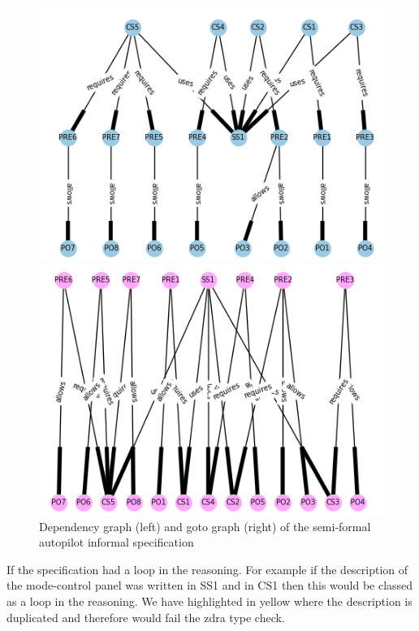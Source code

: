 \begin{figure}[H]
     \centering
     \begin{minipage}{0.45\textwidth}
     \centering
     \includegraphics[scale=0.4]{Figures/fullexample/informaldepgraph.png}
     \end{minipage}\hfill
     \begin{minipage}{0.45\textwidth}
     \centering
     \includegraphics[scale=0.4]{Figures/fullexample/informalgoto.png}
     \end{minipage}
     \caption{Dependency graph (left) and goto graph (right) of the semi-formal autopilot informal specification\label{fig:ifdepgoto}}
     \end{figure}

If the specification had a loop in the reasoning. For example if the description
of the mode-control panel was written in SS1 and in CS1 then this would be classed
as a loop in the reasoning. We have highlighted in yellow where the description
is duplicated and therefore would fail the \gls{zdra} type check.


